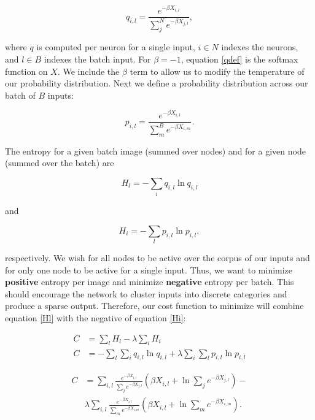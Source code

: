 \begin{equation} \label{qdef}
    q_{i,l} = \frac{e^{-\beta X_{i,l}}}{\sum_{j}^{N} e^{-\beta X_{j,l}}},
\end{equation}

\noindent where $q$ is computed per neuron for a single input, $i \in N$ indexes the neurons, and $l \in B$ indexes the batch input. For $\beta = -1$, equation \ref{qdef} is the softmax function on $X$. We include the $\beta$ term to allow us to modify the temperature of our probability distribution. Next we define a probability distribution across our batch of $B$ inputs:

\begin{equation} \label{pdef}
    p_{i,l} = \frac{e^{-\beta X_{i,l}}}{\sum_{m}^{B} e^{-\beta X_{i,m}}}.
\end{equation}

\noindent The entropy for a given batch image (summed over nodes) and for a given node (summed over the batch) are

\begin{equation} \label{Hl}
    H_{l} = -\sum_{i} q_{i,l} \ln q_{i,l}
\end{equation}

\noindent and

\begin{equation} \label{Hi}
    H_{i} = -\sum_{l} p_{i,l} \ln p_{i,l},
\end{equation}

\noindent respectively. We wish for all nodes to be active over the corpus of our inputs and for only one node to be active for a single input. Thus, we want to minimize \textbf{positive} entropy per image and minimize \textbf{negative} entropy per batch. This should encourage the network to cluster inputs into discrete categories and produce a sparse output. Therefore, our cost function to minimize will combine equation \ref{Hl} with the negative of equation \ref{Hi}:

\begin{displaymath}
\begin{align}

    C& = \sum_{l}H_{l} - \lambda \sum_{i}H_{i}\\

    C& = - \sum_{l}\sum_{i} q_{i,l} \ln q_{i,l} + \lambda \sum_{i}\sum_{l} p_{i,l} \ln p_{i,l}
\end{align}
\end{displaymath}

\begin{equation} \label{cost}
\begin{aligned}
    C& = \sum_{i,l}\frac{e^{-\beta X_{i,l}}}{\sum_{j}e^{-\beta X_{j,l}}} \left(\beta X_{i,l} + \ln{\sum_{j}e^{-\beta X_{j,l}}}\right) -\\ 
     & \lambda \sum_{i,l}\frac{e^{-\beta X_{i,l}}}{\sum_{m} e^{-\beta X_{i,m}}} \left(\beta X_{i,l} + \ln{\sum_{m}e^{-\beta X_{i,m}}}\right).
\end{aligned}
\end{equation}


